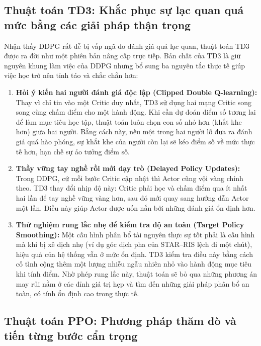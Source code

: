 \subsection{Thuật toán TD3: Khắc phục sự lạc quan quá mức bằng các giải pháp thận trọng}
\label{ssec:td3-ly-thuyet}


Nhận thấy DDPG rất dễ bị vấp ngã do đánh giá quá lạc quan, thuật toán TD3 được ra đời như một phiên bản
nâng cấp trực tiếp. Bản chất của TD3 là giữ nguyên khung làm việc của DDPG nhưng bổ sung ba nguyên tắc
thực tế giúp việc học trở nên tỉnh táo và chắc chắn hơn:
\begin{enumerate}
\item \textbf{Hỏi ý kiến hai người đánh giá độc lập (Clipped Double Q-learning):} Thay vì chỉ tin vào một
  Critic duy nhất, TD3 sử dụng hai mạng Critic song song cùng chấm điểm cho một hành động. Khi cần dự đoán
  điểm số tương lai để làm mục tiêu học tập, thuật toán luôn chọn con số nhỏ hơn (khắt khe hơn) giữa hai
  người. Bằng cách này, nếu một trong hai người lỡ đưa ra đánh giá quá hào phóng, sự khắt khe của người còn
  lại sẽ kéo điểm số về mức thực tế hơn, hạn chế sự ảo tưởng điểm số.
\item \textbf{Thầy vững tay nghề rồi mới dạy trò (Delayed Policy Updates):} Trong DDPG, cứ mỗi bước Critic
  cập nhật thì Actor cũng vội vàng chỉnh theo. TD3 thay đổi nhịp độ này: Critic phải học và chấm điểm qua ít
  nhất hai lần để tay nghề vững vàng hơn, sau đó mới quay sang hướng dẫn Actor một lần. Điều này giúp Actor
  được uốn nắn bởi những đánh giá ổn định hơn.
\item \textbf{Thử nghiệm rung lắc nhẹ để kiểm tra độ an toàn (Target Policy Smoothing):} Một cấu hình phân
  bổ tài nguyên thực sự tốt phải là cấu hình mà khi bị xê dịch nhẹ (ví dụ góc dịch pha của STAR--RIS lệch đi
  một chút), hiệu quả của hệ thống vẫn ở mức ổn định. TD3 kiểm tra điều này bằng cách cố tình cộng thêm một
  lượng nhiễu ngẫu nhiên nhỏ vào hành động mục tiêu khi tính điểm. Nhờ phép rung lắc này, thuật toán sẽ bỏ
  qua những phương án may rủi nằm ở các đỉnh giá trị hẹp và tìm đến những giải pháp phân bổ an toàn, có tính
  ổn định cao trong thực tế.
\end{enumerate}

\subsection{Thuật toán PPO: Phương pháp thăm dò và tiến từng bước cẩn trọng}
\label{ssec:ppo-ly-thuyet}

